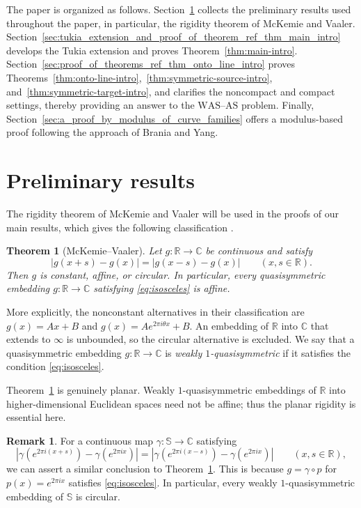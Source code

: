 \documentclass[11pt]{amsart}
\numberwithin{equation}{section}
\newtheorem{theorem}{Theorem}[section]
\theoremstyle{definition} %
\theoremstyle{remarkstyle}
\newtheorem*{remark}{Remark} %
\newcommand{\R}{\mathbb{R}}
\newcommand{\C}{\mathbb{C}}
\begin{document}
The paper is organized as follows. 
Section~\ref{sec:preliminary_results} collects the preliminary results used throughout the paper, in particular,
the rigidity theorem of McKemie and Vaaler.
Section~\ref{sec:tukia_extension_and_proof_of_theorem_ref_thm_main_intro} develops the Tukia extension and proves Theorem~\ref{thm:main-intro}. 
Section~\ref{sec:proof_of_theorems_ref_thm_onto_line_intro} proves Theorems~\ref{thm:onto-line-intro},~\ref{thm:symmetric-source-intro}, and~\ref{thm:symmetric-target-intro}, and clarifies the noncompact and compact settings, thereby providing an answer to the $\mathrm{WAS}$--$\mathrm{AS}$ problem.
Finally, Section~\ref{sec:a_proof_by_modulus_of_curve_families} offers a modulus-based proof following the approach of Brania and Yang.


\section{Preliminary results}\label{sec:preliminary_results}

The rigidity theorem of McKemie and Vaaler will be used in the proofs of our main results, which gives the following classification
\cite[Theorem~1 and Corollary~2]{McKemieVaaler}.

\begin{theorem}[McKemie--Vaaler]\label{thm:MV}
Let $g\colon\R\to\C$ be continuous and satisfy
\begin{equation}\label{eq:isosceles}
 |g(x+s)-g(x)|=|g(x-s)-g(x)|\qquad(x,s\in\R).
\end{equation}
Then $g$ is constant, affine, or circular.  
In particular, every quasisymmetric embedding $g\colon\R\to\C$ satisfying \eqref{eq:isosceles} is affine.
\end{theorem}

More explicitly, the nonconstant alternatives in their classification are $g(x)=Ax+B$ and $g(x)=Ae^{2\pi i\theta x}+B$.  
An embedding of $\R$ into $\C$ that extends to $\infty$ is unbounded, so the circular alternative is excluded.
We say that a quasisymmetric embedding $g\colon\R\to\C$ is {\it weakly $1$-quasisymmetric} if it satisfies the condition \eqref{eq:isosceles}.

Theorem~\ref{thm:MV} is genuinely planar.  
Weakly $1$-quasisymmetric embeddings of $\R$ into higher-dimensional Euclidean spaces need not be affine; thus the planar rigidity is essential here.

\begin{remark}
For a continuous map $\gamma\colon \mathbb S \to \mathbb C$ satisfying
\begin{equation}\label{eq:isosceles-circle}
|\gamma(e^{2\pi i(x+s)})-\gamma(e^{2\pi ix})|=|\gamma(e^{2\pi i(x-s)})-\gamma(e^{2\pi ix})|\qquad(x,s\in\R),
\end{equation}
we can assert a similar conclusion to Theorem~\ref{thm:MV}.
This is because $g=\gamma \circ p$ for $p(x)=e^{2\pi ix}$ satisfies \eqref{eq:isosceles}.
In particular, every weakly $1$-quasisymmetric embedding of $\mathbb S$ is circular.
\end{remark}
\end{document}
